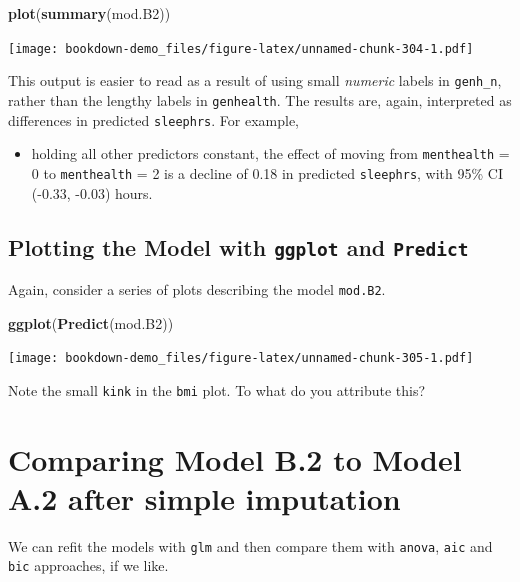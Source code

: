 \documentclass[]{book}
\newenvironment{Shaded}{\begin{snugshade}}{\end{snugshade}}
\newcommand{\KeywordTok}[1]{\textcolor[rgb]{0.13,0.29,0.53}{\textbf{#1}}}
\newcommand{\NormalTok}[1]{#1}
\providecommand{\tightlist}{%
  \setlength{\itemsep}{0pt}\setlength{\parskip}{0pt}}
\theoremstyle{definition}
\theoremstyle{definition}
\theoremstyle{definition}
\theoremstyle{remark}
\begin{document}
\begin{Shaded}
\begin{Highlighting}[]
\KeywordTok{plot}\NormalTok{(}\KeywordTok{summary}\NormalTok{(mod.B2))}
\end{Highlighting}
\end{Shaded}

\texttt{[image: bookdown-demo\_files/figure-latex/unnamed-chunk-304-1.pdf]}

This output is easier to read as a result of using small \emph{numeric}
labels in \texttt{genh\_n}, rather than the lengthy labels in
\texttt{genhealth}. The results are, again, interpreted as differences
in predicted \texttt{sleephrs}. For example,

\begin{itemize}
\tightlist
\item
  holding all other predictors constant, the effect of moving from
  \texttt{menthealth} = 0 to \texttt{menthealth} = 2 is a decline of
  0.18 in predicted \texttt{sleephrs}, with 95\% CI (-0.33, -0.03)
  hours.
\end{itemize}

\subsection{\texorpdfstring{Plotting the Model with \texttt{ggplot} and
\texttt{Predict}}{Plotting the Model with ggplot and Predict}}\label{plotting-the-model-with-ggplot-and-predict-3}

Again, consider a series of plots describing the model \texttt{mod.B2}.

\begin{Shaded}
\begin{Highlighting}[]
\KeywordTok{ggplot}\NormalTok{(}\KeywordTok{Predict}\NormalTok{(mod.B2))}
\end{Highlighting}
\end{Shaded}

\texttt{[image: bookdown-demo\_files/figure-latex/unnamed-chunk-305-1.pdf]}

Note the small \texttt{kink} in the \texttt{bmi} plot. To what do you
attribute this?

\section{Comparing Model B.2 to Model A.2 after simple
imputation}\label{comparing-model-b.2-to-model-a.2-after-simple-imputation}

We can refit the models with \texttt{glm} and then compare them with
\texttt{anova}, \texttt{aic} and \texttt{bic} approaches, if we like.
\end{document}
